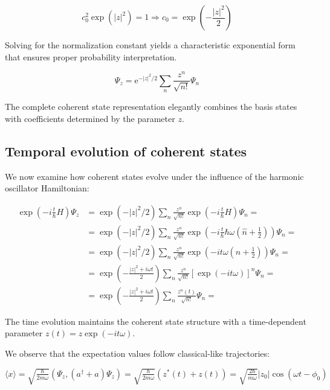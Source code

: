 \documentclass[italian]{HKNdocument}
\begin{document}
\begin{equation}
c_{0}^{2} \exp \left(|z|^{2}\right)=1 \Longrightarrow c_{0}=\exp \left(-\frac{|z|^{2}}{2}\right)
\end{equation}

Solving for the normalization constant yields a characteristic exponential form that ensures proper probability interpretation.

\begin{equation}
\Psi_{z}=\mathrm{e}^{-|z|^{2} / 2} \sum_{n} \frac{z^{n}}{\sqrt{n!}} \Psi_{n}
\end{equation}

The complete coherent state representation elegantly combines the basis states with coefficients determined by the parameter $z$.

\subsection{Temporal evolution of coherent states}
We now examine how coherent states evolve under the influence of the harmonic oscillator Hamiltonian:

\begin{align}
\exp \left(-i \frac{t}{\hbar} H\right) \Psi_{z} & =\exp \left(-|z|^{2} / 2\right) \sum_{n} \frac{z^{n}}{\sqrt{n!}} \exp \left(-i \frac{t}{\hbar} H\right) \Psi_{n}= \\
& =\exp \left(-|z|^{2} / 2\right) \sum_{n} \frac{z^{n}}{\sqrt{n!}} \exp \left(-i \frac{t}{\hbar} \hbar \omega\left(\hat{n}+\frac{1}{2}\right)\right) \Psi_{n}= \\
& =\exp \left(-|z|^{2} / 2\right) \sum_{n} \frac{z^{n}}{\sqrt{n!}} \exp \left(-i t \omega\left(n+\frac{1}{2}\right)\right) \Psi_{n}= \\
& =\exp \left(-\frac{|z|^{2}+i \omega t}{2}\right) \sum_{n} \frac{z^{n}}{\sqrt{n!}}[\exp (-i t \omega)]^{n} \Psi_{n}= \\
& =\exp \left(-\frac{|z|^{2}+i \omega t}{2}\right) \sum_{n} \frac{z^{n}(t)}{\sqrt{n!}} \Psi_{n}=
\end{align}

The time evolution maintains the coherent state structure with a time-dependent parameter $z(t)=z \exp (-i t \omega)$.

We observe that the expectation values follow classical-like trajectories:

$\langle x\rangle=\sqrt{\frac{\hbar}{2 m \omega}}\left(\Psi_{z},\left(a^{\dagger}+a\right) \Psi_{z}\right)=\sqrt{\frac{\hbar}{2 m \omega}}\left(z^{*}(t)+z(t)\right)=\sqrt{\frac{2 \hbar}{m \omega}}\left|z_{0}\right| \cos \left(\omega t-\phi_{0}\right)$
\end{document}
